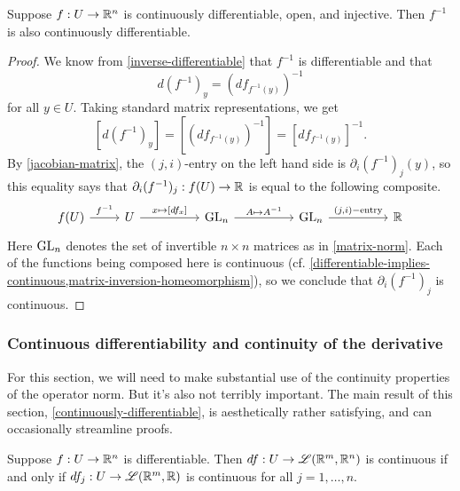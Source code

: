 \begin{proposition} \label{c1-stable-inversion}
	Suppose $f : U \to \mathbb{R}^n$ is continuously differentiable, open, and injective. Then $f^{-1}$ is also continuously differentiable. 
\end{proposition} 

\begin{proof}
	We know from \cref{inverse-differentiable} that $f^{-1}$ is differentiable and that  
	\[ d(f^{-1})_y = (df_{f^{-1}(y)})^{-1} \]
	for all $y \in U$. Taking standard matrix representations, we get
	\[ [d(f^{-1})_y] = [(df_{f^{-1}(y)})^{-1}] = [df_{f^{-1}(y)}]^{-1}.  \]
	By \cref{jacobian-matrix}, the $(j,i)$-entry on the left hand side is $\partial_i (f^{-1})_j(y)$, so this equality says that $\partial_i (f^{-1})_j : f(U) \to \mathbb{R}$ is equal to the following composite. 
	\[ \begin{tikzcd} f(U) \ar{r}{f^{-1}} & U \ar{rr}{x \mapsto [df_x]} & & \GL_n \ar{rr}{A \mapsto A^{-1}} & & \GL_n \ar{rr}{(j,i)-\text{entry}} & & \R \end{tikzcd} \]
	Here $\operatorname{GL}_n$ denotes the set of invertible $n \times n$ matrices as in \cref{matrix-norm}. Each of the functions being composed here is continuous (cf. 
	\cref{differentiable-implies-continuous,matrix-inversion-homeomorphism}), so we conclude that $\partial_i (f^{-1})_j$ is continuous.  
\end{proof}

\subsubsection*{Continuous differentiability and continuity of the derivative \starred}

For this section, we will need to make substantial use of the continuity properties of the operator norm. But it's also not terribly important. The main result of this section, \cref{continuously-differentiable}, is aesthetically rather satisfying, and can occasionally streamline proofs. 

\begin{lemma} \label{continuously-differentiable-by-components}
	Suppose $f : U \to \mathbb{R}^n$ is differentiable. Then $df : U \to \mathscr{L}(\mathbb{R}^m, \mathbb{R}^n)$ is continuous if and only if $df_j : U \to \mathscr{L}(\mathbb{R}^m, \mathbb{R})$ is continuous for all $j = 1, \dotsc, n$. 
\end{lemma}

